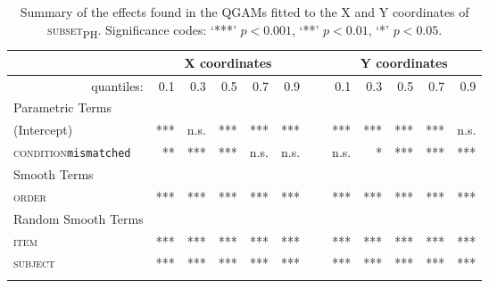 \begin{table}\fontsize{9}{10}
\caption{Summary of the effects found in the QGAMs fitted to the X and Y coordinates of \textsc{subset\textsubscript{PH}}. Significance codes: `***' $p < 0.001$, `**' $p < 0.01$, `*' $p < 0.05$.}
\label{tab:8.9}
\centering
\begin{tabular}{lrrrrrrrrrrr}
\lsptoprule
~                   & \multicolumn{5}{c}{X coordinates}       & \multicolumn{1}{c}{}                       & \multicolumn{5}{c}{Y coordinates}                               \\
\midrule
\multicolumn{1}{r}{quantiles:}          & 0.1        & 0.3        & 0.5        & 0.7        & 0.9  & ~       & 0.1        & 0.3        & 0.5        & 0.7        & 0.9         \\
\midrule
Parametric Terms    & \textbf{~} & \textbf{~} & \textbf{~} & \textbf{~} & \textbf{~} & \textbf{~} & \textbf{~} & \textbf{~} & \textbf{~} & \textbf{~}  \\
\midrule
(Intercept)         & ***        & n.s.         & ***        & ***        & *** & ~       & ***        & ***        & ***        & ***        & n.s.          \\
\textsc{condition}\texttt{mismatched} & **       & ***          & ***        & n.s.        & n.s.    & ~    & n.s.       & *        & ***        & ***        & ***         \\
\midrule
Smooth Terms        & \textbf{~} & \textbf{~} & \textbf{~} & \textbf{~} & \textbf{~} & \textbf{~} & \textbf{~} & \textbf{~} & \textbf{~} & \textbf{~}  \\
\midrule
\textsc{order}               & ***        & ***        & ***        & ***        & ***   & ~     & ***        & ***        & ***        & ***        & ***         \\
\midrule
Random Smooth Terms & \textbf{~} & \textbf{~} & \textbf{~} & \textbf{~} & \textbf{~} & \textbf{~} & \textbf{~} & \textbf{~} & \textbf{~} & \textbf{~}  \\
\midrule
\textsc{item}                & ***        & ***        & ***        & ***        & ***   & ~     & ***        & ***        & ***        & ***        & ***         \\
\textsc{subject}             & ***        & ***        & ***        & ***        & ***  & ~      & ***        & ***        & ***        & ***        & ***        \\
\lspbottomrule
\end{tabular}
\end{table}


